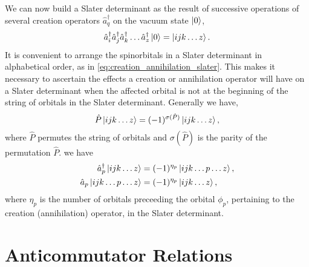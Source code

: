     We can now build a Slater determinant as the result of successive operations of
    several creation operators $\hat{a}_q^\dagger$ on the vacuum state $\ket{0}$,
    \begin{equation}
        \label{eq:creation_annihilation_slater}
        \hat{a}^\dagger_i \hat{a}^\dagger_j \hat{a}^\dagger_k \dots \hat{a}^\dagger_z
        \ket{0} = \ket{ijk \dots z}.
    \end{equation}
    It is convenient to arrange the spinorbitals in a Slater determinant in
    alphabetical order, as in \autoref{eq:creation_annihilation_slater}. This 
    makes it necessary to ascertain the effects a creation or annihilation
    operator will have on a Slater determinant when the affected orbital is
    not at the beginning of the string of orbitals in the Slater determinant.
    Generally we have,
    \begin{equation}
        \hat{P} \ket{ijk \dots z} = (-1)^{\sigma(\hat{P})} \ket{ijk \dots z},
    \end{equation}
    where $\hat{P}$ permutes the string of orbitals and $\sigma(\hat{P})$ is the
    parity of the permutation $\hat{P}$. we have
    \begin{align}
        \hat{a}_p^\dagger \ket{ijk \dots z} &= 
            (-1)^{\eta_p} \ket{ijk \dots p \dots z}, \\
        \hat{a}_p \ket{ijk \dots p \dots z} &=
            (-1)^{\eta_p} \ket{ijk \dots z},
    \end{align}
    where $\eta_p$ is the number of orbitals preceeding the orbital $\phi_p$, pertaining
    to the creation (annihilation) operator, in the Slater determinant.

\section{Anticommutator Relations}

